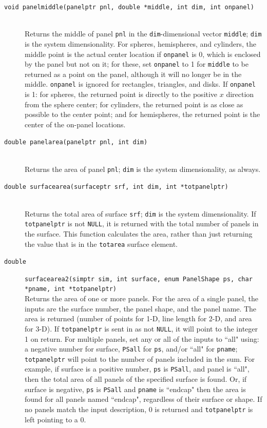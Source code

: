 \documentclass {scrbook}
\newcommand {\ttt} {\texttt}
\begin{document}
\begin{description}
\item[\ttt{void panelmiddle(panelptr pnl, double *middle, int dim, int onpanel)}]
\hfill \\
Returns the middle of panel \ttt{pnl} in the \ttt{dim}-dimensional vector \ttt{middle}; \ttt{dim} is the system dimensionality. For spheres, hemispheres, and cylinders, the middle point is the actual center location if \ttt{onpanel} is 0, which is enclosed by the panel but not on it; for these, set \ttt{onpanel} to 1 for \ttt{middle} to be returned as a point on the panel, although it will no longer be in the middle. \ttt{onpanel} is ignored for rectangles, triangles, and disks. If \ttt{onpanel} is 1: for spheres, the returned point is directly to the positive $x$ direction from the sphere center; for cylinders, the returned point is as close as possible to the center point; and for hemispheres, the returned point is the center of the on-panel locations.

\item[\ttt{double panelarea(panelptr pnl, int dim)}]
\hfill \\
Returns the area of panel \ttt{pnl}; \ttt{dim} is the system dimensionality, as always.

\item[\ttt{double surfacearea(surfaceptr srf, int dim, int *totpanelptr)}]
\hfill \\
Returns the total area of surface \ttt{srf}; \ttt{dim} is the system dimensionality. If \ttt{totpanelptr} is not \ttt{NULL}, it is returned with the total number of panels in the surface. This function calculates the area, rather than just returning the value that is in the \ttt{totarea} surface element.

\item[\ttt{double}]
\ttt{surfacearea2(simptr sim, int surface, enum PanelShape ps, char *pname, int *totpanelptr)}
\hfill \\
Returns the area of one or more panels. For the area of a single panel, the inputs are the surface number, the panel shape, and the panel name. The area is returned (number of points for 1-D, line length for 2-D, and area for 3-D). If \ttt{totpanelptr} is sent in as not \ttt{NULL}, it will point to the integer 1 on return. For multiple panels, set any or all of the inputs to ``all" using: a negative number for surface, \ttt{PSall} for \ttt{ps}, and/or ``all" for \ttt{pname}; \ttt{totpanelptr} will point to the number of panels included in the sum. For example, if surface is a positive number, \ttt{ps} is \ttt{PSall}, and panel is ``all", then the total area of all panels of the specified surface is found. Or, if surface is negative, \ttt{ps} is \ttt{PSall} and \ttt{pname} is ``endcap" then the area is found for all panels named ``endcap", regardless of their surface or shape. If no panels match the input description, 0 is returned and \ttt{totpanelptr} is left pointing to a 0.


\end{description}
\end{document}
